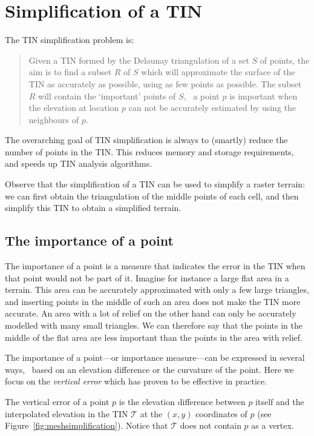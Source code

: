 %
\section{Simplification of a TIN}%
\label{sec:tin-simpl}

The TIN simplification problem is:
\begin{quote}
	Given a TIN formed by the Delaunay triangulation of a set $S$ of points, the aim is to find a subset $R$ of $S$ which will approximate the surface of the TIN as accurately as possible, using as few points as possible. The subset $R$ will contain the `important' points of $S$, \ie\ a point $p$ is important when the elevation at location $p$ can not be accurately estimated by using the neighbours of $p$.
\end{quote}

The overarching goal of TIN simplification is always to (smartly) reduce the number of points in the TIN\@.
This reduces memory and storage requirements, and speeds up TIN analysis algorithms.

Observe that the simplification of a TIN can be used to simplify a raster terrain: we can first obtain the triangulation of the middle points of each cell, and then simplify this TIN to obtain a simplified terrain.


\subsection{The importance of a point}
The importance of a point is a measure that indicates the error in the TIN when that point would not be part of it. 
Imagine for instance a large flat area in a terrain. 
This area can be accurately approximated with only a few large triangles, and inserting points in the middle of such an area does not make the TIN more accurate. 
An area with a lot of relief on the other hand can only be accurately modelled with many small triangles. 
We can therefore say that the points in the middle of the flat area are less important than the points in the area with relief.

The importance of a point---or importance measure---can be expressed in several ways, \eg\  based on an elevation difference or the curvature of the point. Here we focus on the \emph{vertical error} which has proven to be effective in practice.

The vertical error of a point $p$ is the elevation difference between $p$ itself and the interpolated elevation in the TIN $\mathcal{T}$ at the $(x,y)$ coordinates of $p$ (see Figure~\ref{fig:meshsimplification}).  
Notice that $\mathcal{T}$ does not contain $p$ as a vertex.

